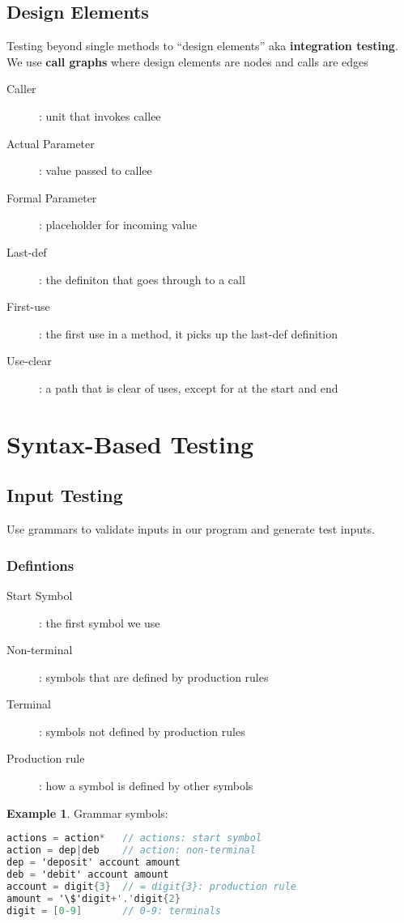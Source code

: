 \documentclass[]{article}
\theoremstyle{definition}
\newtheorem{ex}{Example}[section]
\begin{document}
		\subsection{Design Elements}
			Testing beyond single methods to ``design elements'' aka \textbf{integration testing}. We use \textbf{call graphs} where design elements are nodes and calls are edges
			\begin{description}
				\item[Caller]: unit that invokes callee
				\item[Actual Parameter]: value passed to callee
				\item[Formal Parameter]: placeholder for incoming value
				\item[Last-def]: the definiton that goes through to a call
				\item[First-use]: the first use in a method, it picks up the last-def definition 
				\item[Use-clear]: a path that is clear of uses, except for at the start and end
			\end{description}
	\section{Syntax-Based Testing}
		\subsection{Input Testing}
			Use grammars to validate inputs in our program and generate test inputs.
			\subsubsection{Defintions}
				\begin{description}
					\item[Start Symbol]: the first symbol we use
					\item[Non-terminal]: symbols that are defined by production rules
					\item[Terminal]: symbols not defined by production rules
					\item[Production rule]: how a symbol is defined by other symbols
				\end{description}
				\begin{ex}
					Grammar symbols:
					\begin{lstlisting}[language=C]
actions = action*	// actions: start symbol
action = dep|deb	// action: non-terminal
dep = 'deposit' account amount		
deb = 'debit' account amount		
account = digit{3}	// = digit{3}: production rule
amount = '\$'digit+'.'digit{2}
digit = [0-9]		// 0-9: terminals
					\end{lstlisting}
				\end{ex}
\end{document}
